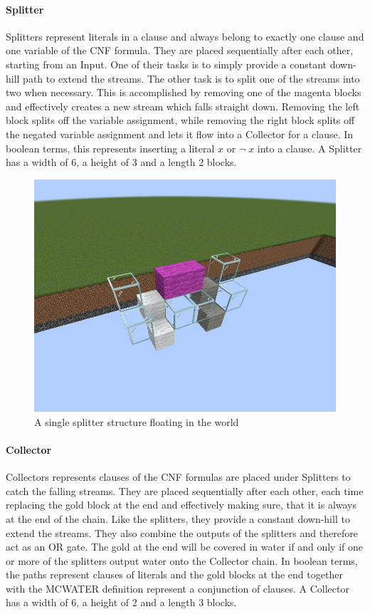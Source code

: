 \paragraph{Splitter}
Splitters represent literals in a clause and always belong to  exactly one clause and one variable of the CNF formula. They are placed sequentially after each other, starting from an Input. One of their tasks is to simply provide a constant down-hill path to extend the streams. The other task is to split one of the streams into two when necessary. This is accomplished by removing one of the magenta blocks and effectively creates a new stream which falls straight down. Removing the left block splits off the variable assignment, while removing the right block splits off the negated variable assignment and lets it flow into a Collector for a clause. In boolean terms, this represents inserting a literal $x$ or $\neg \; x$ into a clause. A Splitter has a width of 6, a height of 3 and a length 2 blocks.

\begin{figure}[h]
    \centering
    \includegraphics[width=0.5\linewidth]{images/splitter.png}
    \caption{A single splitter structure floating in the world}
    \label{fig:splitter}
\end{figure}


    
\paragraph{Collector}
Collectors represents clauses of the CNF formulas are placed under Splitters to catch the falling streams. They are placed sequentially after each other, each time replacing the gold block at the end and effectively making sure, that it is always at the end of the chain. Like the splitters, they provide a constant down-hill to extend the streams. They also combine the outputs of the splitters and therefore act as an OR gate. The gold at the end will be covered in water if and only if one or more of the splitters output water onto the Collector chain. In boolean terms, the paths represent clauses of literals and the gold blocks at the end together with the MCWATER definition represent a conjunction of clauses. A Collector has a width of 6, a height of 2 and a length 3 blocks.

